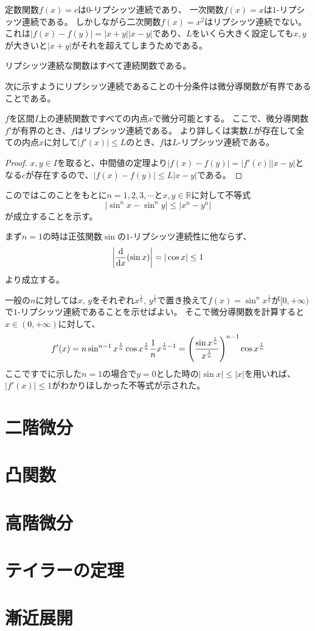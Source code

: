 \begin{example}
定数関数$f(x) = c$は$0$-リプシッツ連続であり、
一次関数$f(x) = x$は$1$-リプシッツ連続である。
しかしながら二次関数$f(x) = x^2$はリプシッツ連続でない。
これは$|f(x)-f(y)| = |x+y||x-y|$であり、$L$をいくら大きく設定しても$x, y$が大きいと$|x+y|$がそれを超えてしまうためである。
\end{example}

\begin{remark}
リプシッツ連続な関数はすべて連続関数である。
\end{remark}

次に示すようにリプシッツ連続であることの十分条件は微分導関数が有界であることである。

\begin{proposition}
$f$を区間$I$上の連続関数ですべての内点$x$で微分可能とする。
ここで、微分導関数$f'$が有界のとき、$f$はリプシッツ連続である。
より詳しくは実数$L$が存在して全ての内点$x$に対して$|f'(x)| \le L$のとき、$f$は$L$-リプシッツ連続である。
\end{proposition}

\begin{proof}
$x, y \in I$を取ると、中間値の定理より$|f(x)-f(y)| = |f'(c)||x-y|$となる$c$が存在するので、$|f(x)-f(y)| \le L|x-y|$である。
\end{proof}

\begin{example}
このではこのことをもとに$n = 1, 2, 3, \cdots$と$x, y \in \mathbb{R}$に対して不等式
$$
|\sin^n x-\sin^n y| \le |x^n-y^n|
$$
が成立することを示す。

まず$n = 1$の時は正弦関数$\sin$の$1$-リプシッツ連続性に他ならず、
$$
\abs{\dv{x}(\sin x)} = |\cos x| \le 1
$$
より成立する。

一般の$n$に対しては$x$, $y$をそれぞれ$x^{\frac{1}{n}}$, $y^{\frac{1}{n}}$で置き換えて$f(x) = \sin^n x^{\frac{1}{n}}$が$[0, +\infty)$で$1$-リプシッツ連続であることを示せばよい。
そこで微分導関数を計算すると$x \in (0, +\infty)$に対して、
$$
f'(x) = n\sin^{n-1}x^{\frac{1}{n}}\cos x^{\frac{1}{n}}\frac{1}{n}x^{\frac{1}{n}-1} = \qty(\frac{\sin x^{\frac{1}{n}}}{x^{\frac{1}{n}}})^{n-1}\cos x^{\frac{1}{n}}
$$
ここですでに示した$n = 1$の場合で$y = 0$とした時の$|\sin x| \le |x|$を用いれば、$|f'(x)| \le 1$がわかりほしかった不等式が示された。
\end{example}

\section{二階微分}

\section{凸関数}

\section{高階微分}

\section{テイラーの定理}

\section{漸近展開}
